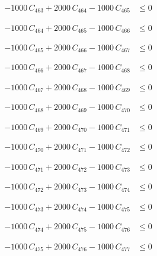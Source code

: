 \documentclass[a4paper,11pt]{article}
\begin{document}
\begin{align}
-1000\,C_{463} + 2000\,C_{464} - 1000\,C_{465} &\leq 0 \nonumber
\end{align}

\begin{align}
-1000\,C_{464} + 2000\,C_{465} - 1000\,C_{466} &\leq 0 \nonumber
\end{align}

\begin{align}
-1000\,C_{465} + 2000\,C_{466} - 1000\,C_{467} &\leq 0 \nonumber
\end{align}

\begin{align}
-1000\,C_{466} + 2000\,C_{467} - 1000\,C_{468} &\leq 0 \nonumber
\end{align}

\begin{align}
-1000\,C_{467} + 2000\,C_{468} - 1000\,C_{469} &\leq 0 \nonumber
\end{align}

\begin{align}
-1000\,C_{468} + 2000\,C_{469} - 1000\,C_{470} &\leq 0 \nonumber
\end{align}

\begin{align}
-1000\,C_{469} + 2000\,C_{470} - 1000\,C_{471} &\leq 0 \nonumber
\end{align}

\begin{align}
-1000\,C_{470} + 2000\,C_{471} - 1000\,C_{472} &\leq 0 \nonumber
\end{align}

\begin{align}
-1000\,C_{471} + 2000\,C_{472} - 1000\,C_{473} &\leq 0 \nonumber
\end{align}

\begin{align}
-1000\,C_{472} + 2000\,C_{473} - 1000\,C_{474} &\leq 0 \nonumber
\end{align}

\begin{align}
-1000\,C_{473} + 2000\,C_{474} - 1000\,C_{475} &\leq 0 \nonumber
\end{align}

\begin{align}
-1000\,C_{474} + 2000\,C_{475} - 1000\,C_{476} &\leq 0 \nonumber
\end{align}

\begin{align}
-1000\,C_{475} + 2000\,C_{476} - 1000\,C_{477} &\leq 0 \nonumber
\end{align}
\end{document}
